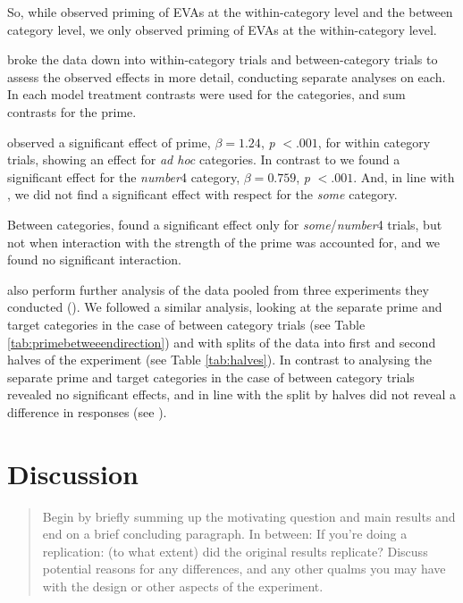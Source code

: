 \documentclass[10pt]{article}
\begin{document}
\begin{multicols}{2}
So, while \citeauthor{Bott:2016aa} observed priming of EVAs at the within-category level and the between category level, we only observed priming of EVAs at the within-category level.

\citeauthor{Bott:2016aa} broke the data down into within-category trials and between-category trials to assess the observed effects in more detail, conducting separate analyses on each.
In each model treatment contrasts were used for the categories, and sum contrasts for the prime.

\citeauthor{Bott:2016aa} observed a significant effect of prime, \(\beta = 1.24\), \emph{p} \(< .001\), for within category trials, showing an effect for \emph{ad hoc} categories.
In contrast to \citeauthor{Bott:2016aa} we found a significant effect for the \emph{number}4 category, \(\beta = 0.759\), \emph{p} \(< .001\).
And, in line with \citeauthor{Bott:2016aa}, we did not find a significant effect with respect for the \emph{some} category.

Between categories, \citeauthor{Bott:2016aa} found a significant effect only for \emph{some}/\emph{number}4 trials, but not when interaction with the strength of the prime was accounted for, and we found no significant interaction.

\citeauthor{Bott:2016aa} also perform further analysis of the data pooled from three experiments they conducted (\citeyear[132--133]{Bott:2016aa}).
We followed a similar analysis, looking at the separate prime and target categories in the case of between category trials (see Table \ref{tab:primebetweeendirection}) and with splits of the data into first and second halves of the experiment (see Table \ref{tab:halves}).
In contrast to \citeauthor{Bott:2016aa} analysing the separate prime and target categories in the case of between category trials revealed no significant effects, and in line with \citeauthor{Bott:2016aa} the split by halves did not reveal a difference in responses (see \textcite[Table 4, 134]{Bott:2016aa}).

\section{Discussion}
\label{sec:discussion}

\begin{quote}
  Begin by briefly summing up the motivating question and main results and end on a brief concluding paragraph. In between:
  If you're doing a replication: (to what extent) did the original results replicate? Discuss potential reasons for any differences, and any other qualms you may have with the design or other aspects of the experiment.
\end{quote}


\end{multicols}
\end{document}
